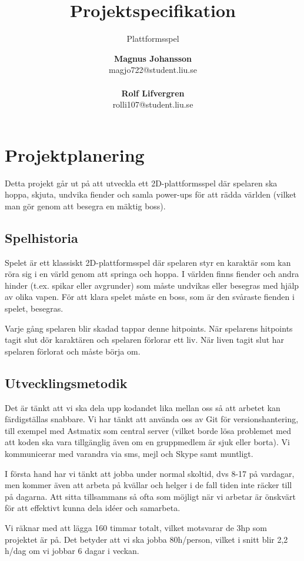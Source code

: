 \documentclass{scrartcl}
\author{\textbf{Magnus Johansson}\\
		magjo722@student.liu.se\\ \\
		\textbf{Rolf Lifvergren}\\
		rolli107@student.liu.se}
\title{Projektspecifikation}
\subtitle{Plattformsspel}
\begin{document}
\maketitle
\clearpage

\section{Projektplanering}
Detta projekt går ut på att utveckla ett 2D-plattformsspel där spelaren ska hoppa, skjuta, undvika fiender och samla power-ups för att rädda världen (vilket man gör genom att besegra en mäktig boss).

\subsection{Spelhistoria}
Spelet är ett klassiskt 2D-plattformsspel där spelaren styr en karaktär som kan röra sig i en värld genom att springa och hoppa. I världen finns fiender och andra hinder (t.ex. spikar eller avgrunder) som måste undvikas eller besegras med hjälp av olika vapen. För att klara spelet måste en boss, som är den svåraste fienden i spelet, besegras.

Varje gång spelaren blir skadad tappar denne hitpoints. När spelarens hitpoints tagit slut dör karaktären och spelaren förlorar ett liv. När liven tagit slut har spelaren förlorat och måste börja om. 

\subsection{Utvecklingsmetodik}\label{utvecklingsmetodik}
Det är tänkt att vi ska dela upp kodandet lika mellan oss så att arbetet kan färdigställas snabbare. Vi har tänkt att använda oss av Git för versionshantering, till exempel med Astmatix som central server (vilket borde lösa problemet med att koden ska vara tillgänglig även om en gruppmedlem är sjuk eller borta). Vi kommunicerar med varandra via sms, mejl och Skype samt muntligt.

I första hand har vi tänkt att jobba under normal skoltid, dvs 8-17 på vardagar, men kommer även att arbeta på kvällar och helger i de fall tiden inte räcker till på dagarna. Att sitta tillsammans så ofta som möjligt när vi arbetar är önskvärt för att effektivt kunna dela idéer och samarbeta.

Vi räknar med att lägga 160 timmar totalt, vilket motsvarar de 3hp som projektet är på. Det betyder att vi ska jobba 80h/person, vilket i snitt blir 2{,}2 h/dag om vi jobbar 6 dagar i veckan.
\end{document}
